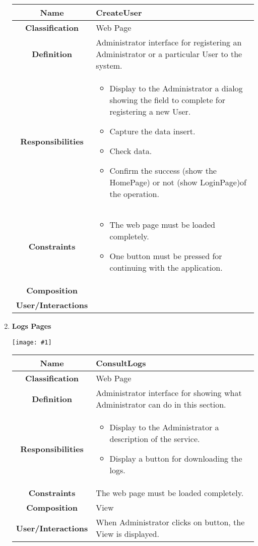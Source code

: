 \documentclass[11pt, a4paper,titlepage]{article}
\newcommand{\image}[1]{
	\begin{center}
		\noindent \texttt{[image: \#1]}
	\end{center}
	}
\begin{document}
\begin{enumerate}
\begin{tabularx}{\textwidth}{| c | X |}
	\hline
	\textbf{Name} & 
	CreateUser
	\\
	\hline
	\textbf{Classification} & 
	Web Page
	\\
	\hline
	\textbf{Definition} & 
	Administrator interface for registering an Administrator or a particular User to the system.
	\\
	\hline
	\textbf{Responsibilities} &
	\begin{itemize}
		\item Display to the Administrator a dialog showing the field to complete for registering a new User.
		\item  Capture the data insert.
		\item Check data.
		\item Confirm the success (show the HomePage) or not (show             LoginPage)of the operation.
	\end{itemize}
	\\
	\hline
	\textbf{Constraints} & 
	\begin{itemize}
		\item  The web page must be loaded completely.
		\item One button must be pressed for continuing with the application.
	\end{itemize}
	\\
	\hline
	\textbf{Composition} & 
	\\
	\hline
	\textbf{User/Interactions} &  	
	\\
	\hline	
\end{tabularx}

\newpage
\item \textbf{Logs Pages}\\
\image{page_log.png}
\begin{tabularx}{\textwidth}{| c | X |}
	\hline
	\textbf{Name} & 
	ConsultLogs
	\\
	\hline
	\textbf{Classification} & 
	Web Page
	\\
	\hline
	\textbf{Definition} & 
	Administrator interface for showing what Administrator can do in this section.\\
	\hline
	\textbf{Responsibilities} &
	\begin{itemize}
		\item Display to the Administrator a description of the service.
		\item Display a button for downloading the logs.
	\end{itemize}
	\\
	\hline
	\textbf{Constraints} & The web page must be loaded completely.
	\\
	\hline
	\textbf{Composition} & 
	View
	\\
	\hline
	\textbf{User/Interactions} & 
	When Administrator clicks on button, the View is displayed.
	\\
	\hline	
\end{tabularx}


\end{enumerate}
\end{document}
